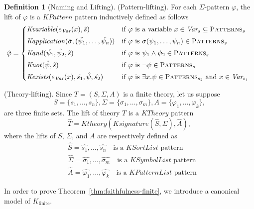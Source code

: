 \documentclass[UTF8,11pt]{article}
\newcounter{thmcounter}
\theoremstyle{plain}
\theoremstyle{definition}
\newtheorem{definition} [thmcounter]{Definition}
\theoremstyle{remark}
\newcommand{\PATTERNS}{\text{P\textsc{atterns}}}
\newcommand{\Kfinite}{{K_\text{finite}}}
\newcommand{\KPatternList}{\mathit{KPatternList}}
\newcommand{\KSortList}{\mathit{KSortList}}
\newcommand{\KSymbolList}{\mathit{KSymbolList}}
\newcommand{\KPattern}{\mathit{KPattern}}
\newcommand{\Kvariable}{\mathit{Kvariable}}
\newcommand{\Kand}{\mathit{Kand}}
\newcommand{\Knot}{\mathit{Knot}}
\newcommand{\Kapplication}{\mathit{Kapplication}}
\newcommand{\Kexists}{\mathit{Kexists}}
\newcommand{\Ksignature}{\mathit{Ksignature}}
\newcommand{\KTheory}{\mathit{KTheory}}
\newcommand{\Ktheory}{\mathit{Ktheory}}
\begin{document}
\begin{definition}[Naming and Lifting]
	(Pattern-lifting).
	For each $\Sigma$-pattern $\varphi$, the lift of $\varphi$ is a $\KPattern$ 
	pattern inductively defined as follows
	\begin{equation*}
	\hat{\varphi} =
	\begin{cases*}
	\Kvariable(e_\Var(x), \hat{s}) & if $\varphi$ is a variable $x \in \Var_s 
	\subseteq \PATTERNS_s$
	\\
	\Kapplication(\hat{\sigma}, (\hat{\psi_1}, \dots, \hat{\psi_n})) & if 
	$\varphi$ is $\sigma(\psi_1,\dots,\psi_n) \in \PATTERNS_s$
	\\
	\Kand(\hat{\psi_1}, \hat{\psi_2}, \hat{s}) & if $\varphi$ is $\psi_1 \wedge 
	\psi_2 \in \PATTERNS_s$
	\\
	\Knot(\hat{\psi}, \hat{s}) & if $\varphi$ is $\neg \psi \in \PATTERNS_s$
	\\
	\Kexists(e_\Var(x), \hat{s_1}, \hat{\psi}, \hat{s_2}) & if $\varphi$ is 
	$\exists x . \psi \in \PATTERNS_{s_2}$ and $x \in \Var_{s_1}$
	\end{cases*}
	\end{equation*}
	
	(Theory-lifting). Since $T = (S, \Sigma, A)$ is a finite theory, let us 
	suppose
	\begin{equation*}
	S = \{ s_1, \dots, s_n \}, 
	\Sigma = \{ \sigma_1, \dots, \sigma_m \}, 
	A = \{ \varphi_1, \dots, \varphi_k \},
	\end{equation*}
	are three finite sets. The lift of theory $T$ is a $\KTheory$ pattern 
	$$ \hat{T} = \Ktheory(\Ksignature(\hat{S}, \hat{\Sigma}), \hat{A}),$$
	where the lifts of $S$, $\Sigma$, and $A$ are respectively defined as
	\begin{align*}
	& \hat{S} = \hat{s_1},\dots,\hat{s_n} 
	\quad \text{is a $\KSortList$ pattern}
	\\
	& \hat{\Sigma} = \hat{\sigma_1},\dots,\hat{\sigma_m}
	\quad \text{is a $\KSymbolList$ pattern}
	\\
	& \hat{A} = \hat{\varphi_1}, \dots, \hat{\varphi_k}
	\quad \text{is a $\KPatternList$ pattern}
	\end{align*}
\end{definition}

In order to prove Theorem~\ref{thm:faithfulness-finite}, we introduce a 
canonical model of $\Kfinite$.
\end{document}

